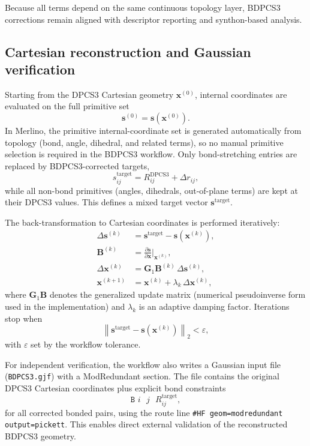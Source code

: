 \documentclass[journal=jctcce,manuscript=article]{achemso}
\begin{document}
Because all terms depend on the same continuous topology layer, BDPCS3 corrections remain aligned with descriptor reporting and synthon-based analysis.

\subsection{Cartesian reconstruction and Gaussian verification}
Starting from the DPCS3 Cartesian geometry $\mathbf{x}^{(0)}$, internal coordinates are evaluated on the full primitive set
\begin{equation}
\mathbf{s}^{(0)}=\mathbf{s}(\mathbf{x}^{(0)}).
\end{equation}
In Merlino, the primitive internal-coordinate set is generated automatically from topology (bond, angle, dihedral, and related terms), so no manual primitive selection is required in the BDPCS3 workflow.
Only bond-stretching entries are replaced by BDPCS3-corrected targets,
\begin{equation}
s^{\mathrm{target}}_{ij}=R^{\mathrm{DPCS3}}_{ij}+\Delta r_{ij},
\end{equation}
while all non-bond primitives (angles, dihedrals, out-of-plane terms) are kept at their DPCS3 values. This defines a mixed target vector $\mathbf{s}^{\mathrm{target}}$.

The back-transformation to Cartesian coordinates is performed iteratively:
\begin{align}
\Delta \mathbf{s}^{(k)} &= \mathbf{s}^{\mathrm{target}}-\mathbf{s}(\mathbf{x}^{(k)}),\\
\mathbf{B}^{(k)} &= \frac{\partial \mathbf{s}}{\partial \mathbf{x}}\bigg|_{\mathbf{x}^{(k)}},\\
\Delta \mathbf{x}^{(k)} &= \mathbf{G}_{1}\mathbf{B}^{(k)}\,\Delta \mathbf{s}^{(k)},\\
\mathbf{x}^{(k+1)} &= \mathbf{x}^{(k)}+\lambda_k\,\Delta \mathbf{x}^{(k)},
\end{align}
where $\mathbf{G}_{1}\mathbf{B}$ denotes the generalized update matrix (numerical pseudoinverse form used in the implementation) and $\lambda_k$ is an adaptive damping factor. Iterations stop when
\begin{equation}
\left\lVert \mathbf{s}^{\mathrm{target}}-\mathbf{s}(\mathbf{x}^{(k)})\right\rVert_2<\varepsilon,
\end{equation}
with $\varepsilon$ set by the workflow tolerance.

For independent verification, the workflow also writes a Gaussian input file (\texttt{BDPCS3.gjf}) with a ModRedundant section. The file contains the original DPCS3 Cartesian coordinates plus explicit bond constraints
\begin{equation}
\texttt{B }i\texttt{ }j\texttt{ }R^{\mathrm{target}}_{ij},
\end{equation}
for all corrected bonded pairs, using the route line \texttt{\#HF geom=modredundant output=pickett}. This enables direct external validation of the reconstructed BDPCS3 geometry.
\end{document}

